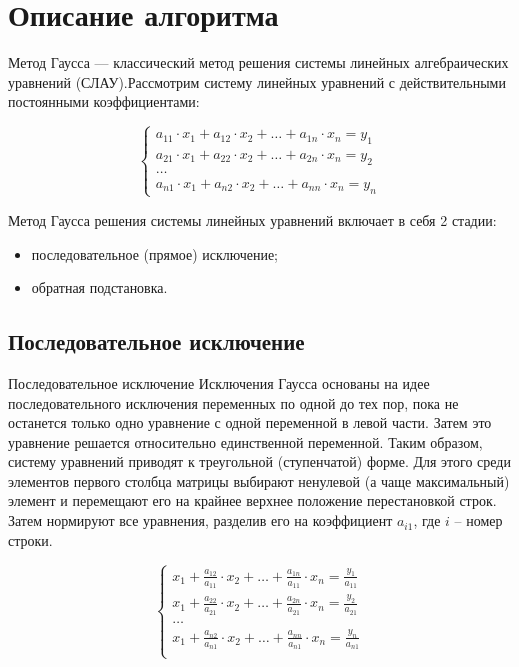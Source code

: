\documentclass[bachelor, och, labwork]{shiza}
\begin{document}

\tableofcontents


\section{Описание алгоритма}

  Метод Гаусса — классический метод решения системы линейных алгебраических уравнений (СЛАУ).Рассмотрим систему линейных уравнений с действительными постоянными коэффициентами:

  \begin{equation*}
    \begin{cases}
      a_{11} \cdot x_1 +  a_{12} \cdot x_2 + \ldots + a_{1n} \cdot x_n = y_1 \\
      a_{21} \cdot x_1 + a_{22} \cdot x_2 + \ldots + a_{2n} \cdot x_n = y_2 \\
      \ldots \\
      a_{n1} \cdot x_1 + a_{n2} \cdot x_2 + \ldots + a_{nn} \cdot x_n = y_n
    \end{cases}
  \end{equation*}

  Метод Гаусса решения системы линейных уравнений включает в себя 2 стадии:

  \begin{itemize}
    \item последовательное (прямое) исключение;
    \item обратная подстановка.
  \end{itemize}

  \subsection{Последовательное исключение}
    Последовательное исключение
    Исключения Гаусса основаны на идее последовательного исключения переменных по одной до тех пор, пока не
    останется только одно уравнение с одной переменной в левой части. Затем это уравнение решается относительно
    единственной переменной. Таким образом, систему уравнений приводят к треугольной (ступенчатой) форме. Для
    этого среди элементов первого столбца матрицы выбирают ненулевой (а чаще максимальный) элемент и перемещают
    его на крайнее верхнее положение перестановкой строк. Затем нормируют все уравнения, разделив его на
    коэффициент $a_{i1}$, где $i$ -- номер строки.
  
    \begin{equation*}
      \begin{cases}
        x_1 +  \frac{a_{12}}{a_{11}} \cdot x_2 + \ldots + \frac{a_{1n}}{a_{11}} \cdot x_n = \frac{y_1}{a_{11}} \\
        x_1 +  \frac{a_{22}}{a_{21}} \cdot x_2 + \ldots + \frac{a_{2n}}{a_{21}} \cdot x_n = \frac{y_2}{a_{21}} \\
        \ldots \\
        x_1 +  \frac{a_{n2}}{a_{n1}} \cdot x_2 + \ldots + \frac{a_{nn}}{a_{n1}} \cdot x_n = \frac{y_n}{a_{n1}} \\
      \end{cases}
    \end{equation*}
\end{document}
